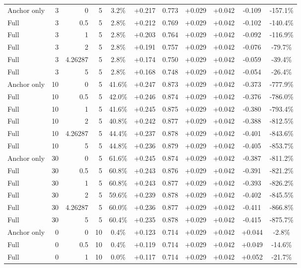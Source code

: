 \begin{table}[htbp]
\begin{tabular}{lrrrccccccc}
Anchor only & 3 & 0 & 5 & 3.2\% & +0.217 & 0.773 & +0.029 & +0.042 & -0.109 & -157.1\% \\
Full & 3 & 0.5 & 5 & 2.8\% & +0.212 & 0.769 & +0.029 & +0.042 & -0.102 & -140.4\% \\
Full & 3 & 1 & 5 & 2.8\% & +0.203 & 0.764 & +0.029 & +0.042 & -0.092 & -116.9\% \\
Full & 3 & 2 & 5 & 2.8\% & +0.191 & 0.757 & +0.029 & +0.042 & -0.076 & -79.7\% \\
Full & 3 & 4.26287 & 5 & 2.8\% & +0.174 & 0.750 & +0.029 & +0.042 & -0.059 & -39.4\% \\
Full & 3 & 5 & 5 & 2.8\% & +0.168 & 0.748 & +0.029 & +0.042 & -0.054 & -26.4\% \\
Anchor only & 10 & 0 & 5 & 41.6\% & +0.247 & 0.873 & +0.029 & +0.042 & -0.373 & -777.9\% \\
Full & 10 & 0.5 & 5 & 42.0\% & +0.246 & 0.874 & +0.029 & +0.042 & -0.376 & -786.0\% \\
Full & 10 & 1 & 5 & 41.6\% & +0.245 & 0.875 & +0.029 & +0.042 & -0.380 & -793.4\% \\
Full & 10 & 2 & 5 & 40.8\% & +0.242 & 0.877 & +0.029 & +0.042 & -0.388 & -812.5\% \\
Full & 10 & 4.26287 & 5 & 44.4\% & +0.237 & 0.878 & +0.029 & +0.042 & -0.401 & -843.6\% \\
Full & 10 & 5 & 5 & 44.8\% & +0.236 & 0.879 & +0.029 & +0.042 & -0.405 & -853.7\% \\
Anchor only & 30 & 0 & 5 & 61.6\% & +0.245 & 0.874 & +0.029 & +0.042 & -0.387 & -811.2\% \\
Full & 30 & 0.5 & 5 & 60.8\% & +0.243 & 0.876 & +0.029 & +0.042 & -0.391 & -821.2\% \\
Full & 30 & 1 & 5 & 60.8\% & +0.243 & 0.877 & +0.029 & +0.042 & -0.393 & -826.2\% \\
Full & 30 & 2 & 5 & 59.6\% & +0.239 & 0.878 & +0.029 & +0.042 & -0.402 & -845.5\% \\
Full & 30 & 4.26287 & 5 & 60.0\% & +0.236 & 0.877 & +0.029 & +0.042 & -0.411 & -866.8\% \\
Full & 30 & 5 & 5 & 60.4\% & +0.235 & 0.878 & +0.029 & +0.042 & -0.415 & -875.7\% \\
Anchor only & 0 & 0 & 10 & 0.4\% & +0.123 & 0.714 & +0.029 & +0.042 & +0.044 & -2.8\% \\
Full & 0 & 0.5 & 10 & 0.4\% & +0.119 & 0.714 & +0.029 & +0.042 & +0.049 & -14.6\% \\
Full & 0 & 1 & 10 & 0.0\% & +0.117 & 0.714 & +0.029 & +0.042 & +0.052 & -21.7\% \\

\end{tabular}
\end{table}
